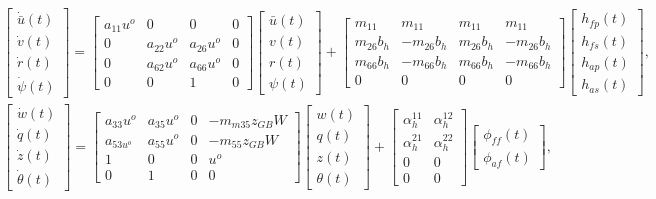 \documentclass[12pt,draftcls,onecolumn]{IEEEtran}
\begin{document}
\begin{eqnarray*}
&&
\begin{bmatrix}\dot{\bar u}(t)\\ \dot v(t)\\ \dot r(t)\\ \dot \psi(t)\end{bmatrix}=
\begin{bmatrix}a_{11}u^o&0&0&0\\ 0&a_{22}u^o&a_{26}u^o&0\\ 0&a_{62}u^o&a_{66}u^o&0\\0&0&1&0\end{bmatrix}
\begin{bmatrix}\bar u(t)\\ v(t)\\ r(t)\\ \psi(t) \end{bmatrix}
+\begin{bmatrix}
m_{11}&m_{11}&m_{11}&m_{11}\\
m_{26}b_h&-m_{26}b_h&m_{26}b_h&-m_{26}b_h\\
m_{66}b_h&-m_{66}b_h&m_{66}b_h&-m_{66}b_h\\
0&0&0&0
\end{bmatrix}
\begin{bmatrix} h_{fp}(t)\\ h_{fs}(t)\\ h_{ap}(t)\\ h_{as}(t)\end{bmatrix},
\\
&&\begin{bmatrix}\dot w(t)\\ \dot q(t)\\ \dot z(t)\\ \dot\theta(t)\end{bmatrix}
=\begin{bmatrix}
a_{33}u^o&a_{35}u^o&0&-m_{m35}z_{GB}W\\ 
a_{53u^o}&a_{55}u^o&0&-m_{55}z_{GB}W\\
1&0&0&u^o\\
0&1&0&0
\end{bmatrix}
\begin{bmatrix}w(t)\\q(t)\\z(t)\\ \theta(t) \end{bmatrix}+
 \begin{bmatrix}\alpha_h^{11}&\alpha_h^{12} \\ \alpha_h^{21}&\alpha_h^{22} \\0&0\\ 0&0
  \end{bmatrix}\begin{bmatrix}\phi_{ff}(t)\\ \phi_{af}(t)\end{bmatrix},
\end{eqnarray*}
\end{document}
